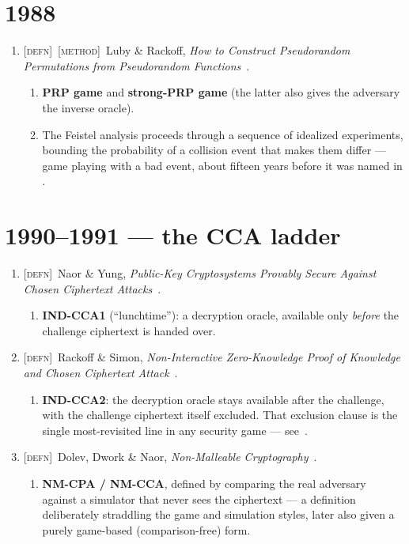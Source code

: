 \documentclass[11pt]{article}
\newcommand{\kind}[1]{{\footnotesize\textsc{\textcolor{yearcolor}{[#1]}}}\ }
\newcommand{\defn}{\kind{defn}}
\newcommand{\method}{\kind{method}}
\newcommand{\paper}[3]{#1, \emph{#2}~\cite{#3}.}
\begin{document}
\section{1988}

\begin{enumerate}
  \item \defn\method \paper{Luby \& Rackoff}{How to Construct Pseudorandom
    Permutations from Pseudorandom Functions}{LR88}
    \begin{enumerate}
      \item \textbf{PRP game} and \textbf{strong-PRP game} (the latter also
        gives the adversary the inverse oracle).
      \item The Feistel analysis proceeds through a sequence of idealized
        experiments, bounding the probability of a collision event that makes
        them differ --- game playing with a bad event, about fifteen years
        before it was named in \cite{BR04}.
    \end{enumerate}
\end{enumerate}

\section{1990--1991 --- the CCA ladder}

\begin{enumerate}
  \item \defn \paper{Naor \& Yung}{Public-Key Cryptosystems Provably Secure
    Against Chosen Ciphertext Attacks}{NY90}
    \begin{enumerate}
      \item \textbf{IND-CCA1} (``lunchtime''): a decryption oracle, available
        only \emph{before} the challenge ciphertext is handed over.
    \end{enumerate}

  \item \defn \paper{Rackoff \& Simon}{Non-Interactive Zero-Knowledge Proof of
    Knowledge and Chosen Ciphertext Attack}{RS91}
    \begin{enumerate}
      \item \textbf{IND-CCA2}: the decryption oracle stays available after the
        challenge, with the challenge ciphertext itself excluded. That exclusion
        clause is the single most-revisited line in any security game ---
        see~\cite{BHK09}.
    \end{enumerate}

  \item \defn \paper{Dolev, Dwork \& Naor}{Non-Malleable Cryptography}{DDN91}
    \begin{enumerate}
      \item \textbf{NM-CPA / NM-CCA}, defined by comparing the real adversary
        against a simulator that never sees the ciphertext --- a definition
        deliberately straddling the game and simulation styles, later also
        given a purely game-based (comparison-free) form.
    \end{enumerate}
\end{enumerate}
\end{document}
